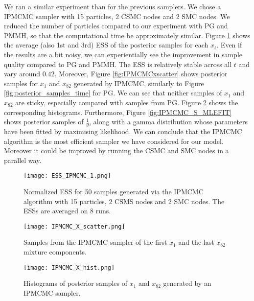 We ran a similar experiment than for the previous samplers. We chose a \gls{IPMCMC} sampler with 15 particles, 2 \gls{CSMC} nodes and 2 \gls{SMC} nodes. We reduced the number of particles compared to our experiment with \gls{PG} and \gls{PMMH}, so that the computational time be approximately similar. 
Figure \ref{fig:ESS_IPMCMC} shows the average (also 1st and 3rd) \gls{ESS} of the posterior samples for each $x_t$. Even if the results are a bit noisy, we can experientially see the improvement in sample quality compared to \gls{PG} and \gls{PMMH}.
The \gls{ESS} is relatively stable across all $t$ and vary around $0.42$. Moreover, Figure \ref{fig:IPMCMCxscatter} shows posterior samples for $x_1$ and $x_{82}$ generated by \gls{IPMCMC}, similarly to Figure \ref{fig:posterior_samples_time} for \gls{PG}. We can see that neither samples of $x_1$ and $x_{82}$ are sticky, especially compared with samples from \gls{PG}. Figure \ref{fig:IPMCMC_x_hist} shows the corresponding histograms. Furthermore, Figure \ref{fig:IPMCMC_S_MLEFIT} shows posterior samples of $\frac{1}{\theta}$, along with a gamma distribution whose parameters have been fitted by maximising likelihood.
We can conclude that the \gls{IPMCMC} algorithm is the most efficient sampler we have considered for our model. Moreover it could be improved by running the \gls{CSMC} and \gls{SMC} nodes in a parallel way.

\begin{figure}[h!]
\centering
\texttt{[image: ESS\_IPMCMC\_1.png]}
    \caption{Normalized \acrfull{ESS} for 50 samples generated via the IPMCMC algorithm with 15 particles, 2 CSMS nodes and 2 SMC nodes. The \gls{ESS}s are averaged on 8 runs.}
    \label{fig:ESS_IPMCMC}
\end{figure}

\begin{figure}[h!]
  \centering
  \begin{minipage}[b]{0.48\textwidth}
    \texttt{[image: IPMCMC\_X\_scatter.png]}
    \caption{Samples from the \gls{IPMCMC} sampler of the first $x_1$ and the last $x_{82}$ mixture components.}
    \label{fig:IPMCMCxscatter}
  \end{minipage}
  \hfill
  \begin{minipage}[b]{0.48\textwidth}
    \texttt{[image: IPMCMC\_X\_hist.png]}
    \caption{Histograms of posterior samples of $x_1$ and $x_{82}$ generated by an \gls{IPMCMC} sampler.}
    \label{fig:IPMCMC_x_hist}
  \end{minipage}
\end{figure}

